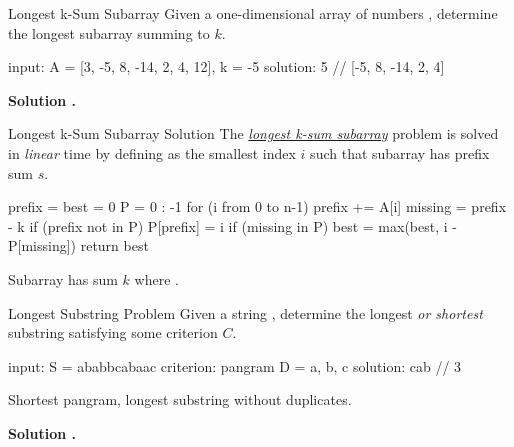 \documentclass{cognito}
\begin{document}
\begin{note}{Longest k-Sum Subarray}
	Given a one-dimensional array of numbers , determine the longest subarray  summing to $k$.
	\begin{largecode}
 input: A = [3, -5, 8, -14, 2, 4, 12], k = -5
 solution: 5  // [-5, 8, -14, 2, 4]
	\end{largecode}	
	
	\bf Solution \hyperref[note:Longest k-Sum Subarray Solution]{\solutionref}.
\end{note}

\begin{note}{Longest k-Sum Subarray Solution}
	The \hyperref[note:Longest k-Sum Subarray]{\it longest k-sum subarray} problem is solved in \emph{linear} time
	by defining  as the smallest index $i$ such that subarray  has prefix sum $s$.
	
	\begin{largecode}
 prefix = best = 0
 P = {0 : -1}
 for (i from 0 to n-1)
 	prefix += A[i]
	missing = prefix - k
	if (prefix not in P) P[prefix] = i
	if (missing in P) best = max(best, i - P[missing])
 return best
	\end{largecode}
	\begin{remark} Subarray  has sum $k$ where .
	\end{remark}\vspace{-5pt}
\end{note}

\begin{note}{Longest Substring Problem}
	Given a string , determine the longest \emph{or shortest} substring  satisfying some criterion $C$.
	\begin{largecode}
 input: S = ababbcabaac
 criterion: pangram D = {a, b, c}
 solution: cab  // 3
	\end{largecode}	
	\vspace{-5pt}
	\begin{example} Shortest pangram, longest substring without duplicates. \end{example}
	\vspace{5pt}
	\bf Solution \hyperref[note:Sliding Window Method]{\solutionref}.
\end{note}
\end{document}
